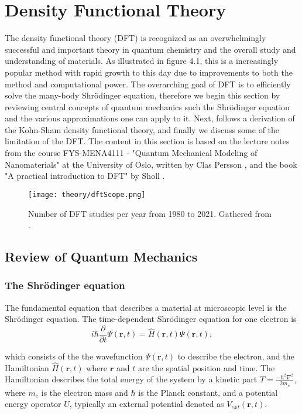 \chapter{Density Functional Theory}
\label{sec:DFT}

The density functional theory (DFT) is recognized as an overwhelmingly successful and important theory in quantum chemistry and the overall study and understanding of materials. As illustrated in figure 4.1, this is a increasingly popular method with rapid growth to this day due to improvements to both the method and computational power. The overarching goal of DFT is to efficiently solve the many-body Shr\"{o}dinger equation, therefore we begin this section by reviewing central concepts of quantum mechanics such the Shr\"{o}dinger equation and the various approximations one can apply to it. Next, follows a derivation of the Kohn-Sham density functional theory, and finally we discuss some of the limitation of the DFT. The content in this section is based on the lecture notes from the course FYS-MENA4111 - "Quantum Mechanical Modeling of Nanomaterials" at the University of Oslo, written by Clas Persson \cite{persson2020}, and the book "A practical introduction to DFT" by Sholl \cite{Sholl2009}. 

\begin{figure}[H]
\centering
\texttt{[image: theory/dftScope.png]}
\caption{Number of DFT studies per year from 1980 to 2021. Gathered from \cite{dimensions}.}
\end{figure}

\section{Review of Quantum Mechanics}

\subsection{The Shr\"{o}dinger equation}
The fundamental equation that describes a material at microscopic level is the Shr\"{o}dinger equation. The time-dependent Shr\"{o}dinger equation for one electron is
\begin{equation}
    i\hbar\frac{\partial}{\partial t}\Psi(\boldsymbol{r}, t) = \hat{H}(\boldsymbol{r},t)\Psi(\boldsymbol{r}, t),
\end{equation}

which consists of the the wavefunction $\Psi(\boldsymbol{r},t)$ to describe the electron, and the Hamiltonian $\hat{H}(\boldsymbol{r},t)$ where $\boldsymbol{r}$ and $t$ are the spatial position and time. The Hamiltonian describes the total energy of the system by a kinetic part $T = \frac{-\hbar^2\nabla^2}{2m_e}$, where $m_e$ is the electron mass and $\hbar$ is the Planck constant, and a potential energy operator $U$, typically an external potential denoted as $V_{ext}(\boldsymbol{r}, t)$. 

